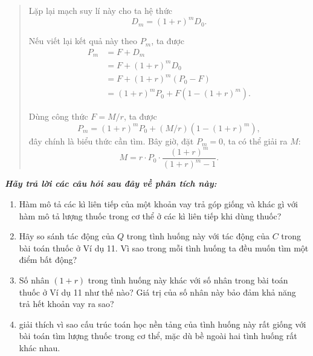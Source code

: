 {\begin{quote}
      Lặp lại mạch suy lí này cho ta hệ thức
      $$
        D_m = (1 + r)^m D_0.
      $$

      \vspace{\baselineskip}
      Nếu viết lại kết quả này theo $P_m$, ta được
      \begin{align*}
      P_m
        &=F+D_m \\
        &=F+(1+r)^mD_0 \\
        &=F+(1+r)^m(P_0-F) \\
        &=(1+r)^mP_0+F\left(1-(1+r)^m\right).
      \end{align*}

      Dùng công thức $F=M/r$, ta được\vspace{\baselineskip}
      $$
        P_m=(1+r)^mP_0+(M/r)\left(1-(1+r)^m\right),
      $$
      đây chính là biểu thức cần tìm. Bây giờ, đặt $P_m=0$, ta có thể giải ra $M$:\vspace{\baselineskip}
      \vspace*{\baselineskip}
      $$
        M=r\cdot P_0\cdot \frac{(1+r)^m}{(1+r)^m-1}.
      $$
    \end{quote}

    \vspace{\baselineskip}\textbf{\emph{Hãy trả lời các câu hỏi sau đây về phân tích này:}}

    \begin{enumerate}
      \item Hàm mô tả các kì liên tiếp của một khoản vay trả góp giống và khác gì với hàm mô tả lượng thuốc trong cơ thể ở các kì liên tiếp khi dùng thuốc?\vspace{\baselineskip}

      \item Hãy so sánh tác động của $Q$ trong tình huống này với tác động của $C$ trong bài toán thuốc ở Ví dụ 11. Vì sao trong mỗi tình huống ta đều muốn tìm một điểm bất động?

      \item Số nhân $(1+r)$ trong tình huống này khác với số nhân trong bài toán thuốc ở Ví dụ 11 như thế nào? Giá trị của số nhân này bảo đảm khả năng trả hết khoản vay ra sao?\vspace{\baselineskip}

      \item giải thích vì sao cấu trúc toán học nền tảng của tình huống này rất giống với bài toán tìm lượng thuốc trong cơ thể, mặc dù bề ngoài hai tình huống rất khác nhau.
    \end{enumerate}\vspace{\baselineskip}

}
